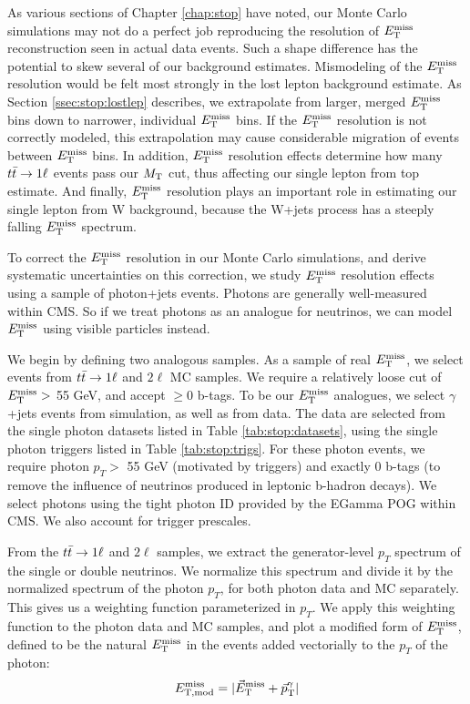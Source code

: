 As various sections of Chapter \ref{chap:stop} have noted, our Monte
Carlo simulations may not do a perfect job reproducing the resolution
of $E_\text{T}^\text{miss}$ reconstruction seen in actual data events. Such a shape difference has
the potential to skew several of our background estimates.
Mismodeling of the $E_\text{T}^\text{miss}$ resolution would be felt most strongly in
the lost lepton background estimate. As Section
\ref{ssec:stop:lostlep} describes, we
extrapolate from larger, merged $E_\text{T}^\text{miss}$ bins down to narrower,
individual $E_\text{T}^\text{miss}$ bins. If the $E_\text{T}^\text{miss}$ resolution is not correctly modeled,
this extrapolation may cause considerable migration of events between
$E_\text{T}^\text{miss}$ bins. In addition, $E_\text{T}^\text{miss}$ resolution effects determine how many
$t\bar{t} \rightarrow 1\ell$ events pass our $M_\text{T}$ cut, thus affecting our single
lepton from top estimate. And finally, $E_\text{T}^\text{miss}$ resolution plays an
important role in estimating our single lepton from W background,
because the W+jets process has a steeply falling $E_\text{T}^\text{miss}$ spectrum.

To correct the $E_\text{T}^\text{miss}$ resolution in our Monte Carlo simulations, and
derive systematic uncertainties on this correction, we study $E_\text{T}^\text{miss}$
resolution effects using a sample of photon+jets events. Photons are
generally well-measured within CMS. So if we treat photons as an
analogue for neutrinos, we can model $E_\text{T}^\text{miss}$ using visible particles
instead.

We begin by defining two analogous samples. As a sample of real
$E_\text{T}^\text{miss}$, we select events from $t\bar{t} \rightarrow 1\ell$ and $2\ell$ MC samples. We
require a relatively loose cut of $E_\text{T}^\text{miss} >$ 55 GeV, and accept $\geq$0
b-tags. To be our $E_\text{T}^\text{miss}$ analogues, we select $\gamma$+jets events
from simulation, as well as from data. The data are selected
from the single photon datasets listed in Table
\ref{tab:stop:datasets}, using the single photon triggers listed in
Table \ref{tab:stop:trigs}. For these photon events, we require photon $p_T
>$ 55 GeV (motivated by triggers) and exactly 0 b-tags (to remove the
influence of neutrinos produced in leptonic b-hadron decays). We
select photons using the tight photon ID provided by the EGamma POG
within CMS. We also account for trigger prescales.

From the $t\bar{t} \rightarrow 1\ell$ and $2\ell$ samples, we extract the
generator-level $p_T$ spectrum of the single or double neutrinos. We
normalize this spectrum and divide it by the normalized spectrum of
the photon $p_T$, for both photon data and MC separately. This gives
us a weighting function parameterized in $p_T$. We apply this
weighting function to the photon data and MC samples, and plot
a modified form of $E_\text{T}^\text{miss}$, defined to be the natural $E_\text{T}^\text{miss}$ in the
events added vectorially to the $p_T$ of the photon:
\begin{equation}
E_\text{T,mod}^\text{miss} = |\vec{E}_\text{T}^\text{miss} + \vec{p}_\text{T}^\gamma|
\end{equation}

